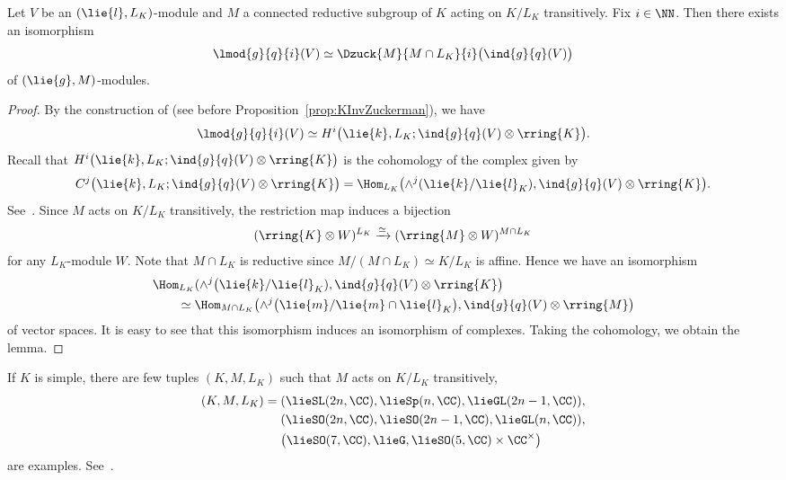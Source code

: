 \begin{Lemma}\label{lem:ZuckermanKtoH}
	Let $V$ be an $(\lie{l}, L_K)$-module and $M$ a connected reductive subgroup of $K$ acting on $K/L_K$ transitively.
	Fix $i \in \NN$.
	Then there exists an isomorphism
	\begin{align*}
		\lmod{g}{q}{i}(V) \simeq \Dzuck{M}{M \cap L_K}{i}\bigl(\ind{g}{q}(V)\bigr)
	\end{align*}
	of $(\lie{g}, M)$-modules.
\end{Lemma}

\begin{proof}
	By the construction of  (see before Proposition~\ref{prop:KInvZuckerman}), we have
	\begin{align*}
		\lmod{g}{q}{i}(V) \simeq H^i\bigl(\lie{k}, L_K; \ind{g}{q}(V)\otimes \rring{K}\bigr).
	\end{align*}
	Recall that $H^i\bigl(\lie{k}, L_K; \ind{g}{q}(V)\otimes \rring{K}\bigr)$ is the cohomology of the complex given by
	\begin{align*}
		C^j\bigl(\lie{k}, L_K; \ind{g}{q}(V)\otimes \rring{K}\bigr) = \Hom_{L_K}\bigl(\wedge^j (\lie{k}/\lie{l}_K),\ind{g}{q}(V)\otimes \rring{K}\bigr).
	\end{align*}
	See~\cite[Section~I.8]{BoWa00_continuous_cohomology}.
	Since $M$ acts on $K/L_K$ transitively, the restriction map induces a bijection
	\begin{align*}
		(\rring{K}\otimes W)^{L_K} \xrightarrow{\simeq} (\rring{M} \otimes W)^{M\cap L_K}
	\end{align*}
	for any $L_K$-module $W$.
	Note that $M\cap L_K$ is reductive since $M/(M\cap L_K) \simeq K/L_K$ is affine.
	Hence we have an isomorphism
	\begin{align*}
		&\Hom_{L_K}(\wedge^j \bigl(\lie{k}/\lie{l}_K),\ind{g}{q}(V)\otimes \rring{K}\bigr) \\
		&\qquad{}\simeq \Hom_{M\cap L_K}\bigl(\wedge^j \bigl(\lie{m}/\lie{m}\cap \lie{l}_K\bigr), \ind{g}{q}(V)\otimes \rring{M}\bigr)
	\end{align*}
	of vector spaces.
	It is easy to see that this isomorphism induces an isomorphism of complexes.
	Taking the cohomology, we obtain the lemma.
\end{proof}

\begin{Example}
	If $K$ is simple, there are few tuples $(K, M, L_K)$ such that $M$ acts on $K/L_K$ transitively,
	\begin{align*}
		(K, M, L_K)={}& (\lieSL(2n,\CC), \lieSp(n,\CC), \lieGL(2n-1, \CC)), \\
		&(\lieSO(2n,\CC), \lieSO(2n-1,\CC), \lieGL(n,\CC)), \\
		&\bigl(\lieSO(7,\CC), \lieG, \lieSO(5,\CC)\times \CC^\times\bigr)
	\end{align*}
	are examples.
	See~\cite[Section 3 and Example 3.7]{Ko11}.
\end{Example}


